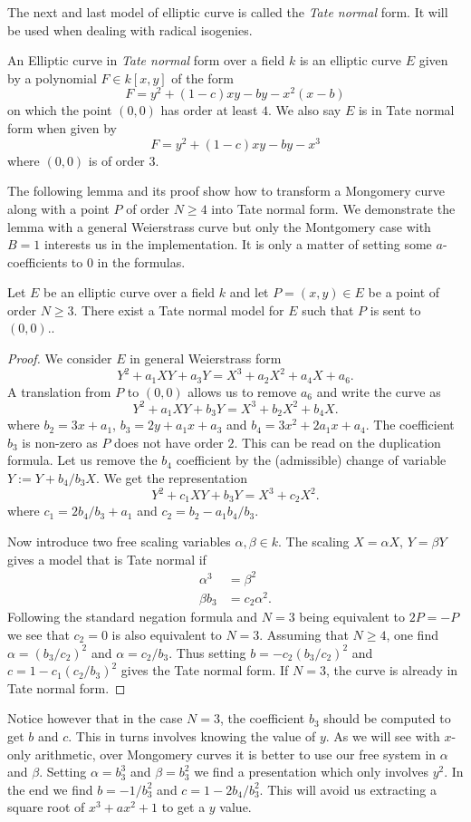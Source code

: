 \documentclass[../main/main.tex]{subfiles}
\begin{document}
The next and last model of elliptic curve is called the \textit{Tate normal} form.
It will be used when dealing with radical isogenies.
\begin{definition}
	An Elliptic curve in \textit{Tate normal} form over a field $k$ is an elliptic curve $E$ given by a polynomial $F\in k[x, y]$ of the form
	\[
		F = y^2 + (1-c)xy - by - x^2(x-b)
	\]
	on which the point $(0,0)$ has order at least $4$.
	We also say $E$ is in Tate normal form when given by
	\[
		F = y^2 + (1-c)xy - by - x^3
	\]
	where $(0,0)$ is of order $3$.
\end{definition}
The following lemma and its proof show how to transform a Mongomery curve along with a point $P$ of order $N\geq 4$ into Tate normal form.
We demonstrate the lemma with a general Weierstrass curve but only the Montgomery case with $B=1$ interests us in the implementation.
It is only a matter of setting some $a$-coefficients to $0$ in the formulas.
\begin{lemma}
	Let $E$ be an elliptic curve over a field $k$ and let $P=(x, y)\in E$ be a point of order $N\geq 3$.
	There exist a Tate normal model for $E$ such that $P$ is sent to $(0,0)$..
\end{lemma}
\begin{proof}
	We consider $E$ in general Weierstrass form
	\[
		Y^2 + a_1XY + a_3Y = X^3 +a_2 X^2 + a_4 X + a_6.
	\]
	A translation from $P$ to $(0, 0)$ allows us to remove $a_6$ and write the curve as
	\[
		Y^2 + a_1XY + b_3Y = X^3 +b_2 X^2 + b_4 X.
	\]
	where $b_2 = 3x+a_1$, $b_3 = 2y + a_1x + a_3$ and $b_4 = 3x^2 +2a_1x+a_4$.
	The coefficient $b_3$ is non-zero as $P$ does not have order $2$.
	This can be read on the duplication formula.
	Let us remove the $b_4$ coefficient by the (admissible) change of variable $Y :=Y + b_4 /b_3  X$.
	We get the representation
	\[
		Y^2 + c_1XY + b_3Y = X^3 +c_2 X^2.
	\]
	where  $c_1 = 2 b_4 / b_3 + a_1$ and $c_2 = b_2 - a_1b_4/b_3$.

	Now introduce two free scaling variables $\alpha, \beta\in k$.
	The scaling $X = \alpha X$, $Y = \beta Y$ gives a model that is Tate normal if
	\begin{align*}
		{\alpha}^3 &= 	{\beta}^2 \\
		\beta b_3 &= c_2 {\alpha}^2.
	\end{align*}
	Following the standard negation formula and $N=3$ being equivalent to $2P = -P$ we see that $c_2 = 0$ is also equivalent to $N=3$.
	Assuming that $N\geq 4$, one find $\alpha = ({b_3}/c_2)^2$ and $\alpha = c_2/b_3$.
	Thus setting $b = -c_2(b_3/c_2)^2$ and $c = 1-c_1(c_2/b_3)^2$ gives the Tate normal form.
	If  $N=3$, the curve is already in Tate normal form.
\end{proof}
Notice however that in the case $N=3$, the coefficient $b_3$ should be computed to get $b$ and $c$.
This in turns involves knowing the value of $y$.
As we will see with $x$-only arithmetic, over Mongomery curves it is better to use our free system in $\alpha$ and $\beta$.
Setting $\alpha = b_3^3$ and $\beta = b_3^2$ we find a presentation which only involves $y^2$.
In the end we find $b = -1/b_3^2$ and $c = 1 - 2b_4 / b_3^2$.
This will avoid us extracting a square root of $x^3 + ax^2 + 1$ to get a $y$ value.
\end{document}
